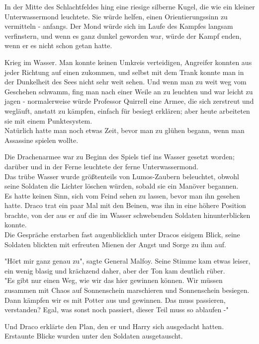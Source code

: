 {In der Mitte des Schlachtfeldes hing eine riesige silberne Kugel, die wie ein kleiner Unterwassermond leuchtete. Sie würde helfen, einen Orientierungssinn zu vermitteln - anfangs. Der Mond würde sich im Laufe des Kampfes langsam verfinstern, und wenn es ganz dunkel geworden war, würde der Kampf enden, wenn er es nicht schon getan hatte.

Krieg im Wasser. Man konnte keinen Umkreis verteidigen, Angreifer konnten aus jeder Richtung auf einen zukommen, und selbst mit dem Trank konnte man in der Dunkelheit des Sees nicht sehr weit sehen. Und wenn man zu weit weg vom Geschehen schwamm, fing man nach einer Weile an zu leuchten und war leicht zu jagen - normalerweise würde Professor Quirrell eine Armee, die sich zerstreut und wegläuft, anstatt zu kämpfen, einfach für besiegt erklären; aber heute arbeiteten sie mit einem Punktesystem.\\ Natürlich hatte man noch etwas Zeit, bevor man zu glühen begann, wenn man Assassine spielen wollte.

Die Drachenarmee war zu Beginn des Spiels tief ins Wasser gesetzt worden; darüber und in der Ferne leuchtete der ferne Unterwassermond.\\ Das trübe Wasser wurde größtenteils von Lumos-Zaubern beleuchtet, obwohl seine Soldaten die Lichter löschen würden, sobald sie ein Manöver begannen.\\ Es hatte keinen Sinn, sich vom Feind sehen zu lassen, bevor man ihn gesehen hatte. Draco trat ein paar Mal mit den Beinen, was ihn in eine höhere Position brachte, von der aus er auf die im Wasser schwebenden Soldaten hinunterblicken konnte.\\ Die Gespräche erstarben fast augenblicklich unter Dracos eisigem Blick, seine Soldaten blickten mit erfreuten Mienen der Angst und Sorge zu ihm auf.

"Hört mir ganz genau zu", sagte General Malfoy. Seine Stimme kam etwas leiser, ein wenig blasig und krächzend daher, aber der Ton kam deutlich rüber.\\ "Es gibt nur einen Weg, wie wir das hier gewinnen können. Wir müssen zusammen mit Chaos auf Sonnenschein marschieren und Sonnenschein besiegen. Dann kämpfen wir es mit Potter aus und gewinnen. Das muss passieren, verstanden? Egal, was sonst noch passiert, dieser Teil muss so ablaufen -"

Und Draco erklärte den Plan, den er und Harry sich ausgedacht hatten.\\ Erstaunte Blicke wurden unter den Soldaten ausgetauscht.

}
